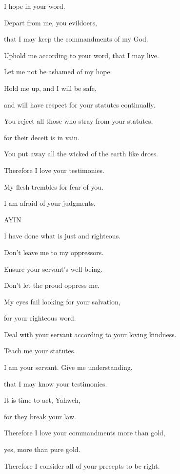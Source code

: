 {\par }{\QB I hope in your word.
\par }{\Q {}Depart from me, you evildoers,
\par }{\QB that I may keep the commandments of my God.
\par }{\Q {}Uphold me according to your word, that I may live.
\par }{\QB Let me not be ashamed of my hope.
\par }{\Q {}Hold me up, and I will be safe,
\par }{\QB and will have respect for your statutes continually.
\par }{\Q {}You reject all those who stray from your statutes,
\par }{\QB for their deceit is in vain.
\par }{\Q {}You put away all the wicked of the earth like dross.
\par }{\QB Therefore I love your testimonies.
\par }{\Q {}My flesh trembles for fear of you.
\par }{\QB I am afraid of your judgments.
\par }{\D AYIN
\par }{\Q {}I have done what is just and righteous.
\par }{\QB Don’t leave me to my oppressors.
\par }{\Q {}Ensure your servant’s well-being.
\par }{\QB Don’t let the proud oppress me.
\par }{\Q {}My eyes fail looking for your salvation,
\par }{\QB for your righteous word.
\par }{\Q {}Deal with your servant according to your loving kindness.
\par }{\QB Teach me your statutes.
\par }{\Q {}I am your servant. Give me understanding,
\par }{\QB that I may know your testimonies.
\par }{\Q {}It is time to act, Yahweh,
\par }{\QB for they break your law.
\par }{\Q {}Therefore I love your commandments more than gold,
\par }{\QB yes, more than pure gold.
\par }{\Q {}Therefore I consider all of your precepts to be right.
}
